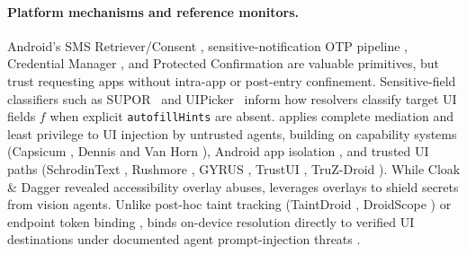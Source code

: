 \paragraph{Platform mechanisms and reference monitors.} Android's SMS Retriever/Consent \cite{androidSmsRetriever,androidSmsConsent}, sensitive-notification OTP pipeline \cite{android15privacy}, Credential Manager \cite{androidCredentialManager}, and Protected Confirmation \cite{androidProtectedConfirmation} are valuable primitives, but trust requesting apps without intra-app or post-entry confinement. Sensitive-field classifiers such as SUPOR~\cite{huang2015supor} and UIPicker~\cite{nan2015uipicker} inform how resolvers classify target UI fields $f$ when explicit \texttt{autofillHints} are absent. \SH{} applies complete mediation and least privilege \cite{saltzer1975protection} to UI injection by untrusted agents, building on capability systems (Capsicum \cite{watson2010capsicum}, Dennis and Van Horn \cite{dennis1966semantics}), Android app isolation \cite{felt2011permission,bugiel2013flexible,rossi2021seapp}, and trusted UI paths (SchrodinText \cite{continella2020schrodintext}, Rushmore \cite{andrus2015rushmore}, GYRUS \cite{jang2014gyrus}, TrustUI \cite{li2014trustui}, TruZ-Droid \cite{ying2018truzdroid}). While Cloak \& Dagger \cite{fratantonio2017cloak} revealed accessibility overlay abuses, \SH{} leverages overlays to shield secrets from vision agents. Unlike post-hoc taint tracking (TaintDroid \cite{enck2010taintdroid}, DroidScope \cite{yan2012droidscope}) or endpoint token binding \cite{rfc8707,rfc9449,rfc9700,webauthn3,nist80063b,rfc4226,rfc6238}, \SH{} binds on-device resolution directly to verified UI destinations under documented agent prompt-injection threats \cite{du2025mobileattacks,liao2024eia,chen2025fineprint,greshake2023indirect,debenedetti2024agentdojo,zhan2024injecagent}.
